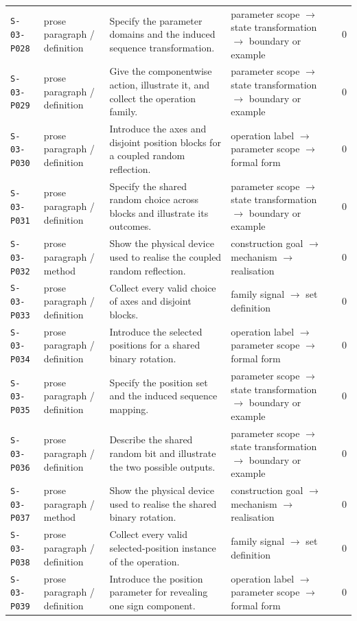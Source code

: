 \documentclass[10pt]{article}
\begin{document}
\begin{longtable}{@{}p{}p{}p{}p{}p{}@{}}
\texttt{S-03-P028}&prose paragraph / definition&Specify the parameter domains and the induced sequence transformation.&parameter scope $\rightarrow$ state transformation $\rightarrow$ boundary or example&0\\
\texttt{S-03-P029}&prose paragraph / definition&Give the componentwise action, illustrate it, and collect the operation family.&parameter scope $\rightarrow$ state transformation $\rightarrow$ boundary or example&0\\
\texttt{S-03-P030}&prose paragraph / definition&Introduce the axes and disjoint position blocks for a coupled random reflection.&operation label $\rightarrow$ parameter scope $\rightarrow$ formal form&0\\
\texttt{S-03-P031}&prose paragraph / definition&Specify the shared random choice across blocks and illustrate its outcomes.&parameter scope $\rightarrow$ state transformation $\rightarrow$ boundary or example&0\\
\texttt{S-03-P032}&prose paragraph / method&Show the physical device used to realise the coupled random reflection.&construction goal $\rightarrow$ mechanism $\rightarrow$ realisation&0\\
\texttt{S-03-P033}&prose paragraph / definition&Collect every valid choice of axes and disjoint blocks.&family signal $\rightarrow$ set definition&0\\
\texttt{S-03-P034}&prose paragraph / definition&Introduce the selected positions for a shared binary rotation.&operation label $\rightarrow$ parameter scope $\rightarrow$ formal form&0\\
\texttt{S-03-P035}&prose paragraph / definition&Specify the position set and the induced sequence mapping.&parameter scope $\rightarrow$ state transformation $\rightarrow$ boundary or example&0\\
\texttt{S-03-P036}&prose paragraph / definition&Describe the shared random bit and illustrate the two possible outputs.&parameter scope $\rightarrow$ state transformation $\rightarrow$ boundary or example&0\\
\texttt{S-03-P037}&prose paragraph / method&Show the physical device used to realise the shared binary rotation.&construction goal $\rightarrow$ mechanism $\rightarrow$ realisation&0\\
\texttt{S-03-P038}&prose paragraph / definition&Collect every valid selected-position instance of the operation.&family signal $\rightarrow$ set definition&0\\
\texttt{S-03-P039}&prose paragraph / definition&Introduce the position parameter for revealing one sign component.&operation label $\rightarrow$ parameter scope $\rightarrow$ formal form&0\\

\end{longtable}
\end{document}
